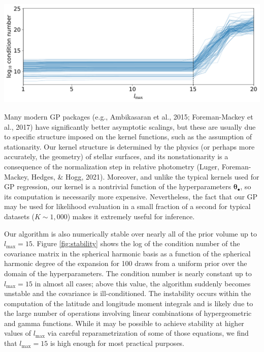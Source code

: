 \documentclass[10pt,a4paper,onecolumn]{article}
\let\origfigure\figure
\let\endorigfigure\endfigure
\renewenvironment{figure}[1][2] {
    \expandafter\origfigure\expandafter[H]
} {
    \endorigfigure
}
\begin{document}
\begin{figure}
\centering
\includegraphics{figures/stability.pdf}
\caption{Log of the condition number of the covariance in the spherical
harmonic basis as a function of the spherical harmonic degree of the
expansion, \(l_\mathrm{max}\). Different lines correspond to different
values of \(\pmb{\theta}_\bullet\) drawn from a uniform prior (see text
for details). In the majority of the cases, the matrix becomes
ill-conditioned above \(l_\mathrm{max} = 15\).\label{fig:stability}}
\end{figure}

Many modern GP packages (e.g., Ambikasaran et al., 2015; Foreman-Mackey
et al., 2017) have significantly better asymptotic scalings, but these
are usually due to specific structure imposed on the kernel functions,
such as the assumption of stationarity. Our kernel structure is
determined by the physics (or perhaps more accurately, the geometry) of
stellar surfaces, and its nonstationarity is a consequence of the
normalization step in relative photometry (Luger, Foreman-Mackey,
Hedges, \& Hogg, 2021). Moreover, and unlike the typical kernels used
for GP regression, our kernel is a nontrivial function of the
hyperparameters \(\pmb{\theta}_\bullet\), so its computation is
necessarily more expensive. Nevertheless, the fact that our GP may be
used for likelihood evaluation in a small fraction of a second for
typical datasets (\(K \sim 1{,000}\)) makes it extremely useful for
inference.

Our algorithm is also numerically stable over nearly all of the prior
volume up to \(l_\mathrm{max} = 15\). Figure \ref{fig:stability} shows
the log of the condition number of the covariance matrix in the
spherical harmonic basis as a function of the spherical harmonic degree
of the expansion for 100 draws from a uniform prior over the domain of
the hyperparameters. The condition number is nearly constant up to
\(l_\mathrm{max} = 15\) in almost all cases; above this value, the
algorithm suddenly becomes unstable and the covariance is
ill-conditioned. The instability occurs within the computation of the
latitude and longitude moment integrals and is likely due to the large
number of operations involving linear combinations of hypergeometric and
gamma functions. While it may be possible to achieve stability at higher
values of \(l_\mathrm{max}\) via careful reparametrization of some of
those equations, we find that \(l_\mathrm{max} = 15\) is high enough for
most practical purposes.
\end{document}
